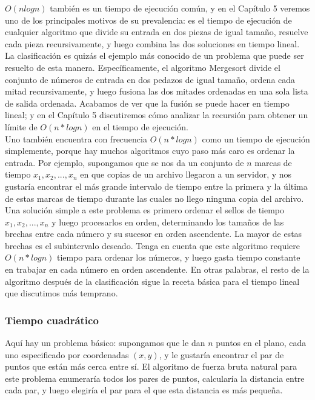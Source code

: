 \documentclass[a4paper, 12pt]{book}
\begin{document}
$O(nlog n)$ también es un tiempo de ejecución común, y en el Capítulo 5 veremos uno de los principales motivos de su prevalencia: es el tiempo de ejecución de cualquier algoritmo que divide su entrada en dos piezas de igual tamaño, resuelve cada pieza recursivamente, y luego combina las dos soluciones en tiempo lineal.\\

La clasificación es quizás el ejemplo más conocido de un problema que puede ser resuelto de esta manera. Específicamente, el algoritmo Mergesort divide el conjunto de números de entrada en dos pedazos de igual tamaño, ordena cada mitad recursivamente, y luego fusiona las dos mitades ordenadas en una sola lista de salida ordenada. Acabamos de ver que la fusión se puede hacer en tiempo lineal; y en el Capítulo 5 discutiremos cómo analizar la recursión para obtener un límite de $O(n*log n)$ en el tiempo de ejecución.\\

Uno también encuentra con frecuencia $O(n*log n)$ como un tiempo de ejecución simplemente, porque hay muchos algoritmos cuyo paso más caro es ordenar la entrada. Por ejemplo, supongamos que se nos da un conjunto de $n$ marcas de tiempo $x_1, x_2,. . . , x_n$ en que copias de un archivo llegaron a un servidor, y nos gustaría encontrar el más grande intervalo de tiempo entre la primera y la última de estas marcas de tiempo durante las cuales no llego ninguna copia del archivo. Una solución simple a este problema es primero ordenar el sellos de tiempo $x_1, x_2,. . . , x_n$ y luego procesarlos en orden, determinando los tamaños de las brechas entre cada número y su sucesor en orden ascendente. La mayor de estas brechas es el subintervalo deseado. Tenga en cuenta que este algoritmo requiere $O(n*log n)$ tiempo para ordenar los números, y luego gasta tiempo constante en trabajar en cada número en orden ascendente. En otras palabras, el resto de la algoritmo después de la clasificación sigue la receta básica para el tiempo lineal que discutimos más temprano.\\

\subsubsection*{Tiempo cuadrático} 
Aquí hay un problema básico: supongamos que le dan $n$ puntos en el plano, cada uno especificado por coordenadas $(x,y)$, y le gustaría encontrar el par de puntos que están más cerca entre sí. El algoritmo de fuerza bruta natural para este problema enumeraría todos los pares de puntos, calcularía la distancia entre cada par, y luego elegiría el par para el que esta distancia es más pequeña.\\
\end{document}
